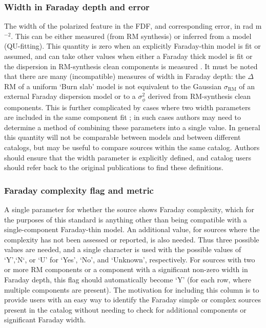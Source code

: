 \documentclass[10pt,modern]{aastex63}
\newcommand{\radu}{rad m$^{-2}$}
\begin{document}
\subsubsection{Width in Faraday depth and error}
The width of the polarized feature in the FDF, and corresponding error, in \radu. This can be either measured (from RM synthesis) or inferred from a model (QU-fitting). This quantity is zero when an explicitly Faraday-thin model is fit or assumed, and can take other values when either a Faraday thick model is fit \citep[e.g.,][]{Ma2019} or the dispersion in RM-synthesis clean components is measured \citep[e.g.,][]{Livingston2021}. It must be noted that there are many (incompatible) measures of width in Faraday depth: the $\Delta$RM of a uniform `Burn slab' model \citep{Burn66} is not equivalent to the Gaussian $\sigma_{\mathrm{RM}}$ of an external Faraday dispersion model \citep{Sokoloff98} or to a $\sigma^2_\phi$ derived from RM-synthesis clean components. This is further complicated by cases where two width parameters are included in the same component fit \citep[e.g., ][]{OSullivan2017}; in such cases authors may need to determine a method of combining these parameters into a single value. In general this quantity will not be comparable between models and between different catalogs, but may be useful to compare sources within the same catalog. Authors should ensure that the width parameter is explicitly defined, and catalog users should refer back to the original publications to find these definitions.

\subsubsection{Faraday complexity flag and metric}
A single parameter for whether the source shows Faraday complexity, which for the purposes of this standard is anything other than being compatible with a single-component Faraday-thin model. An additional value, for sources where the complexity has not been assessed or reported, is also needed. Thus three possible values are needed, and a single character is used with the possible values of `Y',`N`, or `U' for `Yes', `No', and `Unknown', respectively. For sources with two or more RM components or a component with a significant non-zero width in Faraday depth, this flag should automatically become `Y' (for each row, where multiple components are present). The motivation for including this column is to provide users with an easy way to identify the Faraday simple or complex sources present in the catalog without needing to check for additional components or significant Faraday width.
\end{document}
